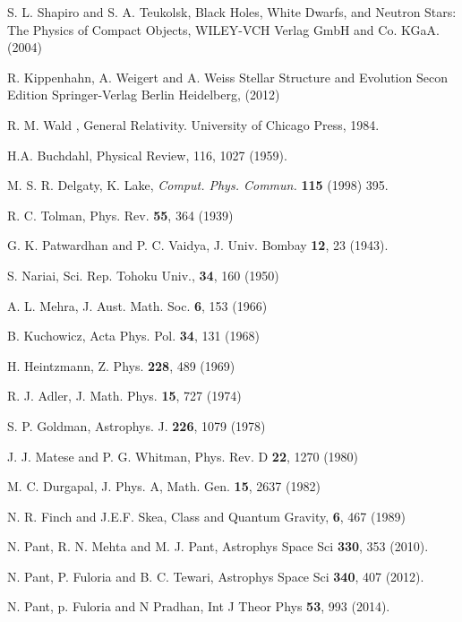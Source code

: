 \documentclass[12pt,onecolumn,a4paper]{article}
\begin{document}
 \newpage

\begin{thebibliography}{99}

S. L. Shapiro and S. A. Teukolsk, 
Black Holes, White Dwarfs, and Neutron Stars: The Physics of Compact Objects,
WILEY-VCH Verlag GmbH and Co. KGaA. (2004)

R. Kippenhahn, A. Weigert and A. Weiss
Stellar Structure and Evolution
Secon Edition 
Springer-Verlag Berlin Heidelberg, (2012) 


R. M. Wald , General Relativity. 
University of Chicago Press, 1984.

H.A. Buchdahl,  
Physical Review, 116, 1027 (1959).

M. S. R. Delgaty, K. Lake, 
{\it Comput. Phys. Commun.}  {\bf 115} (1998) 395.


R. C. Tolman,  
Phys. Rev. {\bf 55}, 364 (1939)

G. K. Patwardhan  and P. C. Vaidya, 
J. Univ. Bombay {\bf 12}, 23 (1943).

S. Nariai, 
Sci. Rep. Tohoku Univ., {\bf 34}, 160 (1950) 


A. L. Mehra, 
J. Aust. Math. Soc. {\bf 6}, 153 (1966)

B. Kuchowicz,
Acta Phys. Pol. {\bf 34}, 131 (1968)

H. Heintzmann,
Z. Phys. {\bf 228}, 489 (1969)

R. J. Adler,
J. Math. Phys. {\bf 15}, 727 (1974)


S. P. Goldman, 
Astrophys. J. {\bf 226}, 1079 (1978)

J. J. Matese  and P. G. Whitman, 
Phys. Rev. D {\bf 22}, 1270 (1980)


M. C. Durgapal, 
J. Phys. A, Math. Gen. {\bf 15}, 2637 (1982) 

N. R. Finch and J.E.F. Skea, 
Class and Quantum Gravity, {\bf 6}, 467 (1989) 


N. Pant, R. N.  Mehta and M. J.  Pant,  
Astrophys Space Sci {\bf 330}, 353 (2010).  

N. Pant, P. Fuloria and B. C.  Tewari, 
Astrophys Space Sci {\bf 340}, 407 (2012).  

N. Pant, p. Fuloria and N Pradhan, 
Int J Theor Phys {\bf 53}, 993 (2014). 



\end{thebibliography}
\end{document}
